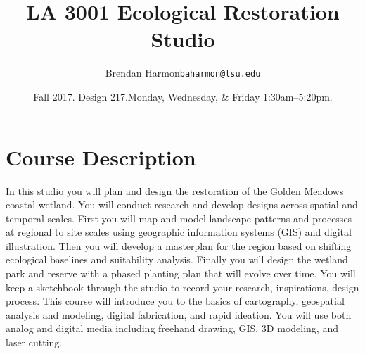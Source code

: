 \documentclass[11pt,article,oneside]{memoir}
\makeatletter
\def\myauthor{Author}
\def\mytitle{Title}
\def\myemail{baharmon@lsu.edu} %
\def\myauthor{Brendan Harmon}
\def\mytitle{{\normalsize \textsc{LA} 3001\newline} \huge \bfseries 
Ecological Restoration Studio}
\makeatother
\begin{document}
\setlength\bibitemsep{0.75em}

\setmainfont[Scale=1, Path = fonts/lato/,BoldItalicFont=Lato-RegIta,BoldFont=Lato-Reg,ItalicFont=Lato-LigIta]{Lato-Lig}
\setsansfont[Scale=1, Path = fonts/lato/,BoldItalicFont=Lato-RegIta,BoldFont=Lato-Reg,ItalicFont=Lato-LigIta]{Lato-Lig}
\setmonofont[Mapping=tex-text,Scale=0.8,Path = fonts/inconsolata/]{i}

\def\ind{\hangindent=1 true cm\hangafter=1 \noindent}
\def\labelitemi{$\cdot$}
\title{\LARGE \mytitle}     
\author{\Large\myauthor \newline \footnotesize\texttt{\noindent\myemail}}
\date{Fall 2017. Design 217.\newline Monday, Wednesday, \& Friday 1:30am--5:20pm.}
\published{\,}



%
%


\vspace*{-10em}
\maketitle

\section{Course Description}

In this studio you will plan and design the restoration 
of the Golden Meadows coastal wetland. 
%
You will conduct research and develop designs 
across spatial and temporal scales.
%
First you will map and model landscape patterns and processes 
at regional to site scales using geographic information systems (GIS) 
and digital illustration. 
Then you will develop a masterplan for the region based on
shifting ecological baselines and suitability analysis.
Finally you will design the wetland park and reserve
with a phased planting plan that will evolve over time. 
%
You will keep a sketchbook through the studio 
to record your research, inspirations, design process.
%
This course will introduce you to the basics of cartography, 
geospatial analysis and modeling, digital fabrication,
and rapid ideation.
You will use both analog and digital media including
freehand drawing, GIS, 3D modeling, 
and laser cutting.
\end{document}
